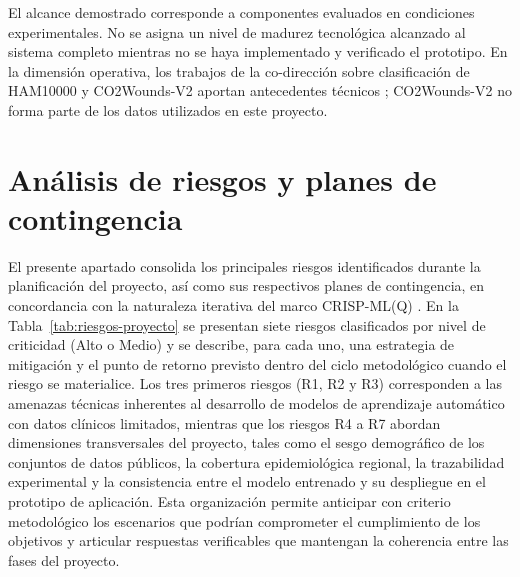El alcance demostrado corresponde a componentes evaluados en condiciones experimentales. No se asigna un nivel de madurez tecnológica alcanzado al sistema completo mientras no se haya implementado y verificado el prototipo. En la dimensión operativa, los trabajos de la co-dirección sobre clasificación de HAM10000 y CO2Wounds-V2 aportan antecedentes técnicos \parencite{calderon2021bilinearcnn,sanchez2024co2woundsv2}; CO2Wounds-V2 no forma parte de los datos utilizados en este proyecto.

\section{Análisis de riesgos y planes de contingencia}

El presente apartado consolida los principales riesgos identificados durante la planificación del proyecto, así como sus respectivos planes de contingencia, en concordancia con la naturaleza iterativa del marco CRISP-ML(Q) \parencite{studer2021crispmlq}. En la Tabla~\ref{tab:riesgos-proyecto} se presentan siete riesgos clasificados por nivel de criticidad (Alto o Medio) y se describe, para cada uno, una estrategia de mitigación y el punto de retorno previsto dentro del ciclo metodológico cuando el riesgo se materialice. Los tres primeros riesgos (R1, R2 y R3) corresponden a las amenazas técnicas inherentes al desarrollo de modelos de aprendizaje automático con datos clínicos limitados, mientras que los riesgos R4 a R7 abordan dimensiones transversales del proyecto, tales como el sesgo demográfico de los conjuntos de datos públicos, la cobertura epidemiológica regional, la trazabilidad experimental y la consistencia entre el modelo entrenado y su despliegue en el prototipo de aplicación. Esta organización permite anticipar con criterio metodológico los escenarios que podrían comprometer el cumplimiento de los objetivos y articular respuestas verificables que mantengan la coherencia entre las fases del proyecto.

